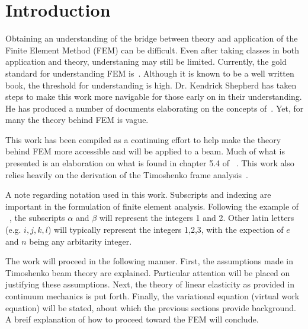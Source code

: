 \section{Introduction}

%

Obtaining an understanding of the bridge between theory and application of the Finite Element Method (FEM) can be difficult.
Even after taking classes in both application and theory, understaning  may still be limited.
Currently, the gold standard for understanding FEM is~\cite{hughes-fem}.
Although it is known to be a well written book, the threshold for understanding is high.
Dr. Kendrick Shepherd has taken steps to make this work more navigable for those early on in their understanding. 
He has produced a number of documents elaborating on the concepts of~\cite{hughes-fem}.
Yet, for many the theory behind FEM is vague.

This work has been compiled as a continuing effort to help make the theory behind FEM more accessible and will be applied to a beam.
Much of what is presented is an elaboration on what is found in chapter 5.4 of ~\cite{hughes-fem}.
This work also relies heavily on the derivation of the Timoshenko frame analysis~\cite{shepherd-frame}.

A note regarding notation used in this work.
Subscripts and indexing are important in the formulation of finite element analysis.
Following the example of ~\cite{hughes-fem}, the subscripts  $\alpha$ and $\beta$ will represent the integers 1 and 2.
Other latin letters (e.g. $i,j,k,l$) will typically represent the integers 1,2,3, with the expection of $e$ and $n$ being any arbitarity integer.

The work will proceed in the following manner.
First, the assumptions made in Timoshenko beam theory are explained.
Particular attention will be placed on justifying these assumptions. 
Next, the theory of linear elasticity as provided in continuum mechanics is put forth.
Finally, the variational equation (virtual work equation) will be stated, about which the previous sections provide background.
A breif explanation of how to proceed toward the FEM will conclude. 
